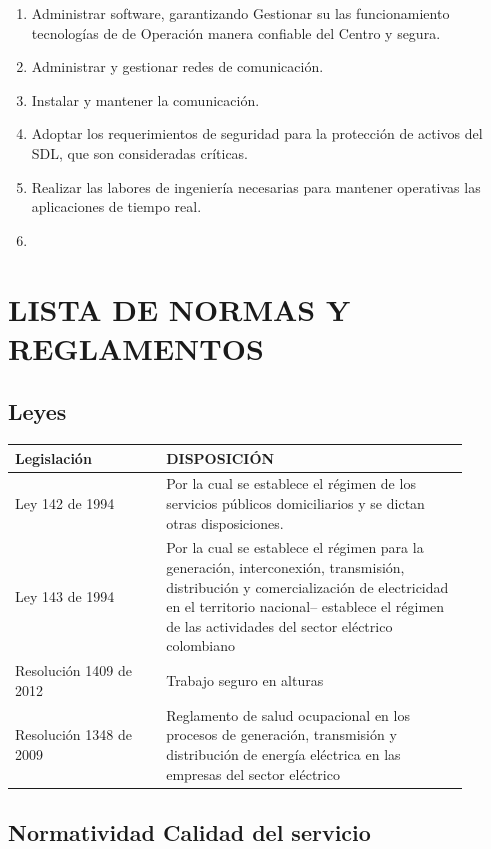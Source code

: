 \documentclass[a5paper]{book}%
\begin{document}
\begin{enumerate}
	\item Administrar  software, garantizando Gestionar su las funcionamiento tecnologías de de Operación manera confiable del Centro  y segura.
	\item  Administrar y gestionar redes de comunicación.
	\item Instalar  y mantener  la comunicación.
	\item Adoptar los requerimientos de seguridad para la protección de activos del \ac{SDL},  que son consideradas críticas.
	\item Realizar las labores de ingeniería necesarias para mantener operativas las aplicaciones  de tiempo real.
	\item 
\end{enumerate}


    \chapter{LISTA DE NORMAS Y REGLAMENTOS}

\section{Leyes}

\begin{tabular}{|p{0.3\linewidth}|p{0.6\linewidth}|}
	\hline
	Legislación & DISPOSICIÓN \\\hline
	Ley 142 de 1994& Por la cual se establece el régimen de los servicios públicos domiciliarios y se dictan otras disposiciones.\\\hline
	Ley 143 de 1994& Por la cual se establece el régimen para la generación, interconexión, transmisión, distribución y comercialización de electricidad en el territorio nacional– establece el régimen de las actividades del sector eléctrico colombiano\\\hline
	Resolución 1409 de 2012  & Trabajo seguro en alturas \\\hline
	Resolución 1348 de 2009 & Reglamento de salud ocupacional
	en los procesos de generación, transmisión y distribución de
	energía eléctrica en las empresas del sector eléctrico \\\hline
\end{tabular}

\section{Normatividad Calidad del servicio}
\end{document}
